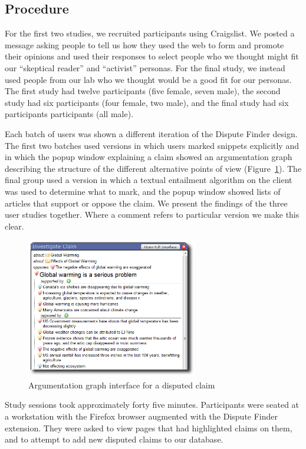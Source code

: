 \documentclass{www2010-accepted}
\begin{document}
\subsection{Procedure}

For the first two studies, we recruited participants using Craigslist. We posted a message asking people to tell us how they used the web to form and promote their opinions and used their responses to select people who we thought might fit our ``skeptical reader'' and ``activist'' personas. For the final study, we instead used people from our lab who we thought would be a good fit for our personas. The first study had twelve participants (five female, seven male), the second study had six participants (four female, two male), and the final study had six participants participants (all male). 

Each batch of users was shown a different iteration of the Dispute Finder design. The first two batches used versions in which users marked snippets explicitly and in which the popup window explaining a claim showed an argumentation graph describing the structure of the different alternative points of view (Figure~\ref{popup_graph}). The final group used a version in which a textual entailment algorithm on the client was used to determine what to mark, and the popup window showed lists of articles that support or oppose the claim. We present the findings of the three user studies together. Where a comment refers to particular version we make this clear.

\begin{figure}[tb]
	\begin{center}
	\includegraphics[width=7.5cm]{pictures/popup_graph_crop.png}
	\caption{Argumentation graph interface for a disputed claim}
	\label{popup_graph}
	\end{center}
\end{figure}


Study sessions took approximately forty five minutes. Participants were seated at a workstation with the Firefox browser augmented with the Dispute Finder extension. They were asked to view pages that had highlighted claims on them, and to attempt to add new disputed claims to our database.
\end{document}
